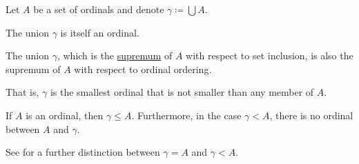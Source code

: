 \begin{proposition}\label{thm:union_of_set_of_ordinals}
  Let \( A \) be a set of ordinals and denote \( \gamma \coloneqq \bigcup A \).

  \begin{thmenum}
     The union \( \gamma \) is itself an ordinal.

     The union \( \gamma \), which is the \hyperref[def:partially_ordered_set_extremal_points/supremum_and_infimum]{supremum} of \( A \) with respect to set inclusion, is also the supremum of \( A \) with respect to ordinal ordering.

    That is, \( \gamma \) is the smallest ordinal that is not smaller than any member of \( A \).

     If \( A \) is an ordinal, then \( \gamma \leq A \). Furthermore, in the case \( \gamma < A \), there is no ordinal between \( A \) and \( \gamma \).

    See  for a further distinction between \( \gamma = A \) and \( \gamma < A \).
  \end{thmenum}
\end{proposition}
